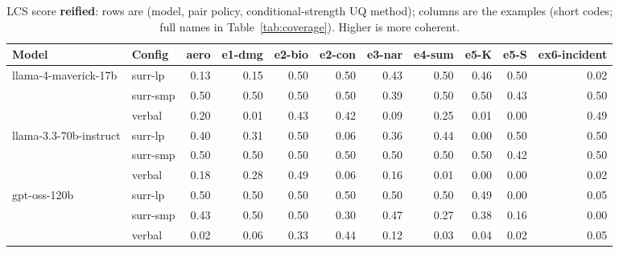 \documentclass[11pt]{article}
\begin{document}
\begin{table}[htbp]
\centering
\footnotesize
\setlength{\tabcolsep}{3.5pt}
\caption{LCS score \textbf{reified}: rows are (model, pair policy, conditional-strength UQ method); columns are the examples (short codes; full names in Table~\ref{tab:coverage}). Higher is more coherent.}
\label{tab:reified}
\begin{tabular}{llrrrrrrrrr}
\toprule
\textbf{Model} & \textbf{Config} & \textbf{aero} & \textbf{e1-dmg} & \textbf{e2-bio} & \textbf{e2-con} & \textbf{e3-nar} & \textbf{e4-sum} & \textbf{e5-K} & \textbf{e5-S} & \textbf{ex6-incident} \\
\midrule
llama-4-maverick-17b & surr-lp & 0.13 & 0.15 & 0.50 & 0.50 & 0.43 & 0.50 & 0.46 & 0.50 & 0.02 \\
 & surr-smp & 0.50 & 0.50 & 0.50 & 0.50 & 0.39 & 0.50 & 0.50 & 0.43 & 0.50 \\
 & verbal & 0.20 & 0.01 & 0.43 & 0.42 & 0.09 & 0.25 & 0.01 & 0.00 & 0.49 \\
\midrule
llama-3.3-70b-instruct & surr-lp & 0.40 & 0.31 & 0.50 & 0.06 & 0.36 & 0.44 & 0.00 & 0.50 & 0.50 \\
 & surr-smp & 0.50 & 0.50 & 0.50 & 0.50 & 0.50 & 0.50 & 0.50 & 0.42 & 0.50 \\
 & verbal & 0.18 & 0.28 & 0.49 & 0.06 & 0.16 & 0.01 & 0.00 & 0.00 & 0.02 \\
\midrule
gpt-oss-120b & surr-lp & 0.50 & 0.50 & 0.50 & 0.50 & 0.50 & 0.50 & 0.49 & 0.00 & 0.05 \\
 & surr-smp & 0.43 & 0.50 & 0.50 & 0.30 & 0.47 & 0.27 & 0.38 & 0.16 & 0.00 \\
 & verbal & 0.02 & 0.06 & 0.33 & 0.44 & 0.12 & 0.03 & 0.04 & 0.02 & 0.05 \\
\bottomrule
\end{tabular}
\end{table}
\end{document}
